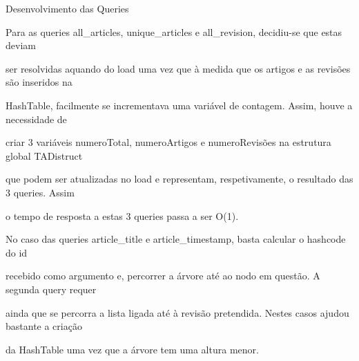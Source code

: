 \documentclass[a4paper,portrait,12pt]{article}
\begin{document}
\begin{flushleft}
Desenvolvimento das Queries
\end{flushleft}


\begin{flushleft}
Para as queries all\_articles, unique\_articles e all\_revision, decidiu-se que estas deviam
\end{flushleft}


\begin{flushleft}
ser resolvidas aquando do load uma vez que à medida que os artigos e as revisões são inseridos na
\end{flushleft}


\begin{flushleft}
HashTable, facilmente se incrementava uma variável de contagem. Assim, houve a necessidade de
\end{flushleft}


\begin{flushleft}
criar 3 variáveis numeroTotal, numeroArtigos e numeroRevisões na estrutura global TADistruct
\end{flushleft}


\begin{flushleft}
que podem ser atualizadas no load e representam, respetivamente, o resultado das 3 queries. Assim
\end{flushleft}


\begin{flushleft}
o tempo de resposta a estas 3 queries passa a ser O(1).
\end{flushleft}


\begin{flushleft}
No caso das queries article\_title e article\_timestamp, basta calcular o hashcode do id
\end{flushleft}


\begin{flushleft}
recebido como argumento e, percorrer a árvore até ao nodo em questão. A segunda query requer
\end{flushleft}


\begin{flushleft}
ainda que se percorra a lista ligada até à revisão pretendida. Nestes casos ajudou bastante a criação
\end{flushleft}


\begin{flushleft}
da HashTable uma vez que a árvore tem uma altura menor.
\end{flushleft}
\end{document}
